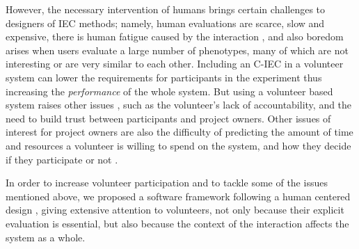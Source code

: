 However, the necessary intervention of humans brings certain challenges 
to designers of IEC methods; namely, human evaluations are scarce, slow and expensive, there is
human fatigue caused by the interaction \cite{ie1}, and also boredom arises
when users evaluate a large number of phenotypes, 
many of which are not interesting or are very similar to each other.
Including an C-IEC in a volunteer system can lower the requirements for
participants in the experiment thus increasing the {\em performance} of the whole system. But using a volunteer based 
system raises other issues \cite{sarmenta2001volunteer,web:BOINC}, such as the 
volunteer's lack of accountability, and the need to build trust between participants and project
owners. Other issues of interest for project owners are also the difficulty of predicting 
the amount of time and resources a volunteer is willing to spend on the system, 
and how they decide if they participate or not \cite{JJ:2016}. 

In order to increase volunteer participation and to tackle some of the issues mentioned above,  
we proposed a software framework following a human centered design \cite{greenhouse2012human},
giving extensive attention to volunteers, not only because their
explicit evaluation is essential, but also because the context of the 
interaction affects the system as a whole.


